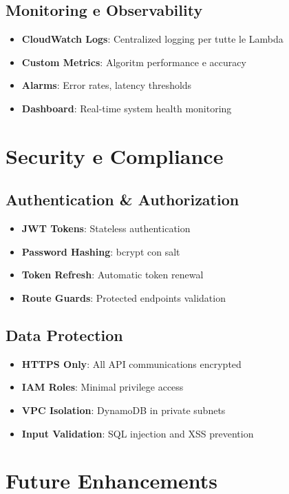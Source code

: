\documentclass[11pt,a4paper]{article}
\begin{document}
\subsection{Monitoring e Observability}
\begin{itemize}
  \item \textbf{CloudWatch Logs}: Centralized logging per tutte le Lambda
  \item \textbf{Custom Metrics}: Algoritm performance e accuracy
  \item \textbf{Alarms}: Error rates, latency thresholds
  \item \textbf{Dashboard}: Real-time system health monitoring
\end{itemize}

\section{Security e Compliance}

\subsection{Authentication \& Authorization}
\begin{itemize}
  \item \textbf{JWT Tokens}: Stateless authentication
  \item \textbf{Password Hashing}: bcrypt con salt
  \item \textbf{Token Refresh}: Automatic token renewal
  \item \textbf{Route Guards}: Protected endpoints validation
\end{itemize}

\subsection{Data Protection}
\begin{itemize}
  \item \textbf{HTTPS Only}: All API communications encrypted
  \item \textbf{IAM Roles}: Minimal privilege access
  \item \textbf{VPC Isolation}: DynamoDB in private subnets
  \item \textbf{Input Validation}: SQL injection and XSS prevention
\end{itemize}

\section{Future Enhancements}
\end{document}
